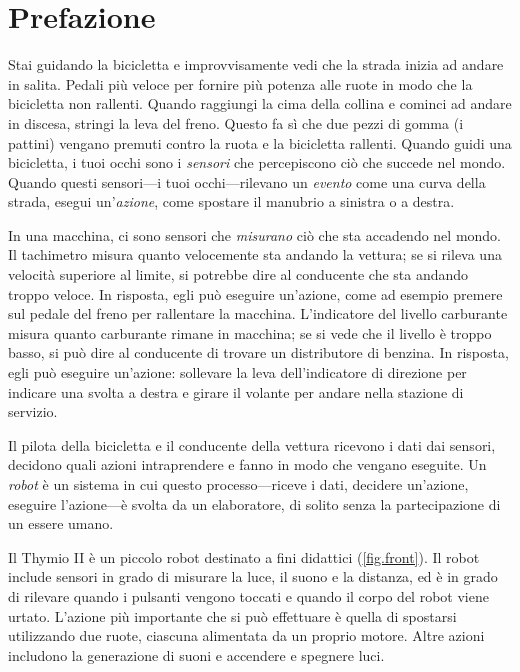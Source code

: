 
\chapter*{Prefazione}


Stai guidando la bicicletta e improvvisamente vedi che la strada inizia
ad andare in salita. Pedali più veloce per fornire più potenza alle ruote in modo
che la bicicletta non rallenti. Quando raggiungi la cima della collina e
cominci ad andare in discesa, stringi la leva del freno. Questo fa sì che due pezzi di gomma
(i pattini) vengano premuti contro la ruota e la bicicletta rallenti.
Quando guidi una bicicletta, i tuoi occhi sono i \textit{sensori}  che percepiscono ciò che
succede nel mondo. Quando questi sensori---i tuoi occhi---rilevano un
\textit{evento} come una curva della strada, esegui un'\textit{azione}, come spostare il manubrio a sinistra o a destra.

In una macchina, ci sono sensori che \textit{misurano} ciò che sta accadendo nel
mondo. Il tachimetro misura  quanto velocemente sta andando la vettura; se si rileva una velocità superiore al limite, si potrebbe dire al conducente che
sta andando troppo veloce. In risposta, egli può eseguire un'azione, come ad esempio
premere sul pedale del freno per rallentare la macchina. L'indicatore del livello carburante
misura quanto carburante rimane in macchina; se si vede che il livello è troppo
basso, si può dire al conducente di trovare un distributore di benzina. In risposta, egli può
eseguire un'azione: sollevare la leva dell'indicatore di direzione per indicare una svolta a destra
e girare il volante per andare nella stazione di servizio.

Il pilota della bicicletta e il conducente della vettura ricevono i dati dai sensori, decidono quali azioni intraprendere e fanno in modo che vengano eseguite. Un \textit{robot} è un sistema in cui questo processo---riceve i dati,
decidere un'azione, eseguire l'azione---è svolta da un
elaboratore, di solito senza la partecipazione di un essere umano.


Il Thymio II è un piccolo robot destinato a fini didattici
(\cref{fig.front}). Il robot include sensori in grado di misurare
la luce, il suono e la distanza, ed è in grado di rilevare quando i pulsanti vengono toccati e
quando il corpo del robot viene urtato. L'azione più importante che si può
effettuare è quella di spostarsi utilizzando due ruote, ciascuna alimentata da un proprio motore.
Altre azioni includono la generazione di suoni e accendere e spegnere luci.

